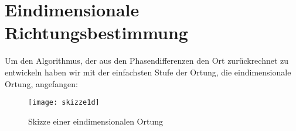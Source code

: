 \section{Eindimensionale Richtungsbestimmung} 
  Um den Algorithmus, der aus den Phasendifferenzen den Ort zurückrechnet zu entwickeln haben wir mit der
einfachsten Stufe der Ortung, die eindimensionale Ortung, angefangen:
    \begin{figure}
        \centering
        \texttt{[image: skizze1d]}
        \caption{Skizze einer eindimensionalen Ortung}
    \end{figure}
